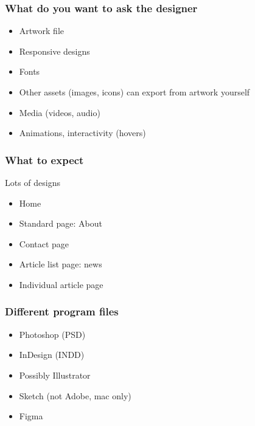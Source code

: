 
\subsubsection{What do you want to ask the designer}

\begin{itemize}
    \item Artwork file
    \item Responsive designs
    \item Fonts
    \item Other assets (images, icons) can export from artwork yourself
    \item Media (videos, audio)
    \item Animations, interactivity (hovers)
\end{itemize}


\subsubsection{What to expect}

Lots of designs

\begin{itemize}
    \item Home
    \item Standard page: About
    \item Contact page
    \item Article list page: news
    \item Individual article page
\end{itemize}


\subsubsection{Different program files}

\begin{itemize}
    \item Photoshop (PSD)
    \item InDesign (INDD)
    \item Possibly Illustrator
    \item Sketch (not Adobe, mac only)
    \item Figma
\end{itemize}



